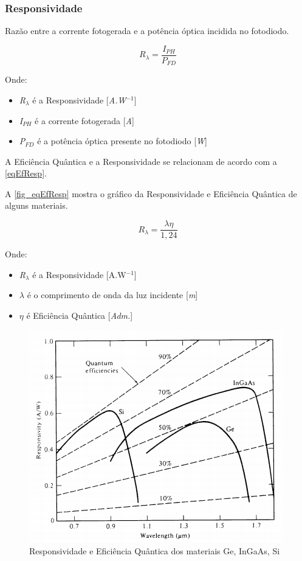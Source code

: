 \subsubsection{Responsividade}
Razão entre a corrente fotogerada e a potência óptica incidida no fotodiodo.

\begin{equation}
    \label{eq_responsividade}
    R_\lambda = \frac{I_{PH}}{P_{FD}}
\end{equation}

Onde:
\begin{itemize}
    \item \textit{R$_\lambda$} \'e a Responsividade [\textit{A.W$^{-1}$}]
    \item \textit{I$_{PH}$} \'e a corrente fotogerada [\textit{A}]
    \item \textit{P$_{FD}$} \'e a potência \'optica presente no fotodiodo [\textit{W}]
\end{itemize}

A Eficiência Quântica e a Responsividade se relacionam de acordo com a \autoref{eqEfResp}.

A \autoref{fig_eqEfResp} mostra o gráfico da Responsividade e Efici\^encia Qu\^antica de alguns materiais.

\begin{equation}
    \label{eqEfResp}
    R_\lambda = \frac{\lambda\eta}{1,24}
\end{equation}

Onde:
\begin{itemize}
    \item \textit{R$_\lambda$} \'e a Responsividade [A.W$^{-1}$]
    \item $\lambda$ \'e o comprimento de onda da luz incidente [\textit{m}]
    \item $\eta$ \'e Efici\^encia Qu\^antica [\textit{Adm.}]
\end{itemize}

\begin{figure}[!h]
	\caption{\label{fig_responsividade}Responsividade e Efici\^encia Qu\^antica dos materiais Ge, InGaAs, Si}
	\begin{center}
	    \includegraphics[scale=0.5]{Imagens/GraficoRespostaEspectral.png}
	\end{center}
	\label{fig_eqEfResp}
\end{figure}


